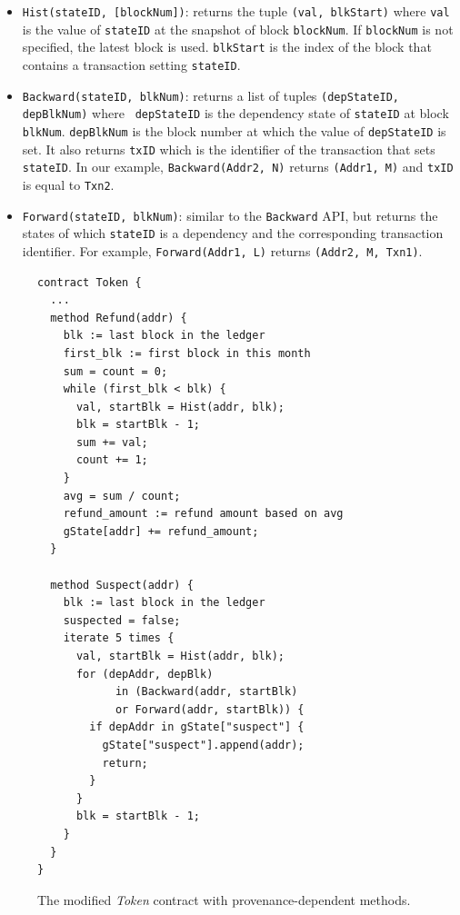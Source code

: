\begin{itemize}
    \item \texttt{Hist(stateID, [blockNum])}: returns the tuple \texttt{(val, blkStart)} where \texttt{val}
    is the value of \texttt{stateID} at the snapshot of block \texttt{blockNum}. If \texttt{blockNum} is not specified, the latest block is used. \texttt{blkStart} is the index of the block that contains a transaction setting \texttt{stateID}. 

    \item \texttt{Backward(stateID, blkNum)}: returns a list of tuples \texttt{(depStateID, depBlkNum)} where \texttt{ depStateID} is the dependency state of \texttt{stateID} at block \texttt{blkNum}. \texttt{depBlkNum} is the block number at which the value of \texttt{depStateID} is set. It also returns \texttt{txID} which is the identifier of the transaction that sets \texttt{stateID}.
    In our example, \texttt{Backward(Addr2, N)} returns \texttt{(Addr1, M)} and \texttt{txID} is equal to \texttt{Txn2}. 

    \item \texttt{Forward(stateID, blkNum)}: similar to the \texttt{Backward} API, but returns the states of
    which \texttt{stateID} is a dependency and the corresponding transaction identifier. For example, \texttt{Forward(Addr1, L)} returns \texttt{(Addr2, M, Txn1)}.
\end{itemize}

\begin{figure}[t]
\footnotesize
\centering
\begin{verbatim}
contract Token {
  ...
  method Refund(addr) {
    blk := last block in the ledger
    first_blk := first block in this month
    sum = count = 0;
    while (first_blk < blk) {
      val, startBlk = Hist(addr, blk);
      blk = startBlk - 1; 
      sum += val;
      count += 1;
    }
    avg = sum / count;
    refund_amount := refund amount based on avg
    gState[addr] += refund_amount;
  }

  method Suspect(addr) {
    blk := last block in the ledger
    suspected = false;
    iterate 5 times {
      val, startBlk = Hist(addr, blk);
      for (depAddr, depBlk) 
            in (Backward(addr, startBlk) 
            or Forward(addr, startBlk)) {
        if depAddr in gState["suspect"] {
          gState["suspect"].append(addr);
          return;
        }
      }
      blk = startBlk - 1; 
    }
  }
}

\end{verbatim}
\caption{The modified \textit{Token} contract with provenance-dependent methods.}
\label{code:prov:enhanced_contract}
\end{figure}

